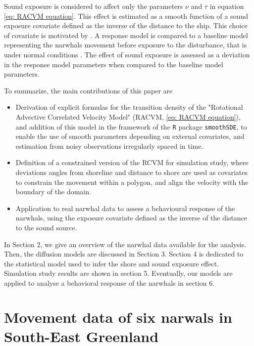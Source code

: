 \documentclass[11pt]{article}
\newcommand {\1}{\mathbb{1}}
\theoremstyle{definition}
\theoremstyle{remark}
\theoremstyle{remark}
\begin{document}
Sound exposure is considered to affect only the parameters $\nu$ and $\tau$ in equation \ref{eq: RACVM equation}. This effect is estimated as a smooth function of a sound exposure covariate defined as the inverse of the distance to the ship. This choice of covariate is motivated by \cite{heide-jorgensen_behavioral_2021}. A response model is compared to a baseline model representing the narwhals movement before exposure to the disturbance, that is under normal conditions \cite{michelot_continuous-time_2022}.
The effect of sound exposure is assessed as a deviation in the response model parameters when compared to the baseline model parameters.



To summarize, the main contributions of this paper are
\begin{itemize}
	\item Derivation of explicit formulas for the transition density of the "Rotational Advective Correlated Velocity Model" (RACVM, \ref{eq: RACVM equation}), and addition of this model in the framework of  the \texttt{R} package \texttt{smoothSDE}, to enable the use of smooth parameters depending on external covariates, and estimation from noisy observations irregularly spaced in time.
	\item Definition of a constrained version of the RCVM for simulation study, where deviations angles from shoreline and distance to shore are used as covariates to constrain the movement within a polygon, and align the velocity with the boundary of the domain.
	\item Application to real narwhal data to assess a behavioural response of the narwhals, using the exposure covariate defined as the inverse of the distance to the sound source.
\end{itemize}

In Section 2, we give an overview of the narwhal data available for the analysis.
Then, the diffusion models are discussed in Section 3. Section 4 is dedicated to the statistical model used to infer the shore and sound exposure effect. Simulation study results are shown in section 5. Eventually, our models are applied to analyse a behavioral response of the narwhals in section 6.





\section{Movement data of six narwals in South-East Greenland}
\end{document}
